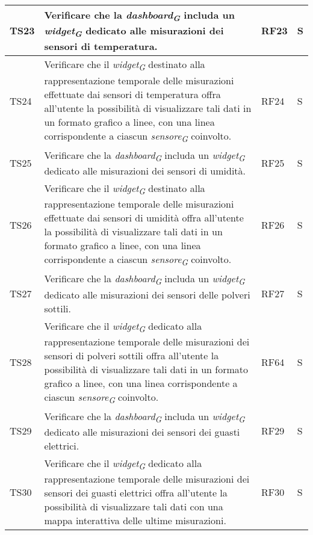 \begin{longtable}{|C{1.9cm}|L{5cm}|C{2cm}|C{2cm}|}
    TS23 & Verificare che la \textit{dashboard}\textsubscript{\textit{G}} includa un \textit{widget}\textsubscript{\textit{G}} dedicato alle misurazioni dei sensori di temperatura. & RF23 & S \\
    \hline

    TS24 & Verificare che il \textit{widget}\textsubscript{\textit{G}} destinato alla rappresentazione temporale delle misurazioni effettuate dai sensori di temperatura offra all'utente la possibilità di visualizzare tali dati in un formato grafico a linee, con una linea corrispondente a ciascun \textit{sensore}\textsubscript{\textit{G}} coinvolto. & RF24 & S \\
    \hline

    TS25 & Verificare che la \textit{dashboard}\textsubscript{\textit{G}} includa un \textit{widget}\textsubscript{\textit{G}} dedicato alle misurazioni dei sensori di umidità. & RF25 & S \\
    \hline

    TS26 & Verificare che il \textit{widget}\textsubscript{\textit{G}} destinato alla rappresentazione temporale delle misurazioni effettuate dai sensori di umidità offra all'utente la possibilità di visualizzare tali dati in un formato grafico a linee, con una linea corrispondente a ciascun \textit{sensore}\textsubscript{\textit{G}} coinvolto. & RF26 & S \\
    \hline

    TS27 & Verificare che la \textit{dashboard}\textsubscript{\textit{G}} includa un \textit{widget}\textsubscript{\textit{G}} dedicato alle misurazioni dei sensori delle polveri sottili. & RF27 & S \\
    \hline

    TS28 & Verificare che il \textit{widget}\textsubscript{\textit{G}} dedicato alla rappresentazione temporale delle misurazioni dei sensori di polveri sottili offra all'utente la possibilità di visualizzare tali dati in un formato grafico a linee, con una linea corrispondente a ciascun \textit{sensore}\textsubscript{\textit{G}} coinvolto. & RF64 & S \\
    \hline

    TS29 & Verificare che la \textit{dashboard}\textsubscript{\textit{G}} includa un \textit{widget}\textsubscript{\textit{G}} dedicato alle misurazioni dei sensori dei guasti elettrici. & RF29 & S \\
    \hline

    TS30 & Verificare che il \textit{widget}\textsubscript{\textit{G}} dedicato alla rappresentazione temporale delle misurazioni dei sensori dei guasti elettrici offra all'utente la possibilità di visualizzare tali dati con una mappa interattiva delle ultime misurazioni. & RF30 & S \\
    \hline


\end{longtable}
